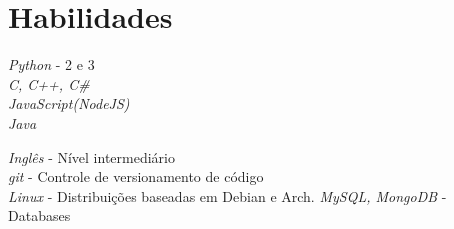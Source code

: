 \documentclass[10pt]{article} %
\begin{document}

\section{Habilidades}

{
\textit{Python} - 2 e 3\\
\textit{C, C++, C\#}\\
\textit{JavaScript(NodeJS)}\\
\textit{Java}\\
}


{
\textit{Inglês} - Nível intermediário\\
\textit{git} - Controle de versionamento de código\\
\textit{Linux} - Distribuições baseadas em Debian e Arch.
\textit{MySQL, MongoDB} - Databases
}



\end{document}
